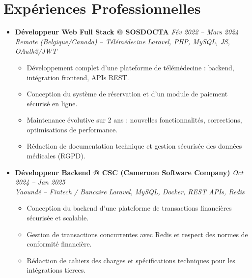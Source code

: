 \documentclass[a4paper,11pt]{article}
\begin{document}
\section{Expériences Professionnelles}
\begin{itemize}[leftmargin=*, label={-}]

\item \textbf{Développeur Web Full Stack @ SOSDOCTA} \hfill \textit{Fév 2022 -- Mars 2024} \\
\textit{Remote (Belgique/Canada) -- Télémédecine} \hfill \textit{Laravel, PHP, MySQL, JS, OAuth2/JWT}
\vspace{-2pt}
    \begin{itemize}[leftmargin=0.4cm, nosep, label=\tiny$\bullet$]
        \item \small{Développement complet d'une plateforme de télémédecine : backend, intégration frontend, APIs REST.}
        \item \small{Conception du système de réservation et d'un module de paiement sécurisé en ligne.}
        \item \small{Maintenance évolutive sur 2 ans : nouvelles fonctionnalités, corrections, optimisations de performance.}
        \item \small{Rédaction de documentation technique et gestion sécurisée des données médicales (RGPD).}
    \end{itemize}
\vspace{3pt}

\item \textbf{Développeur Backend @ CSC (Cameroon Software Company)} \hfill \textit{Oct 2024 -- Jan 2025} \\
\textit{Yaoundé -- Fintech / Bancaire} \hfill \textit{Laravel, MySQL, Docker, REST APIs, Redis}
\vspace{-2pt}
    \begin{itemize}[leftmargin=0.4cm, nosep, label=\tiny$\bullet$]
        \item \small{Conception du backend d'une plateforme de transactions financières sécurisée et scalable.}
        \item \small{Gestion de transactions concurrentes avec Redis et respect des normes de conformité financière.}
        \item \small{Rédaction de cahiers des charges et spécifications techniques pour les intégrations tierces.}
    \end{itemize}
\vspace{3pt}


\end{itemize}
\end{document}
